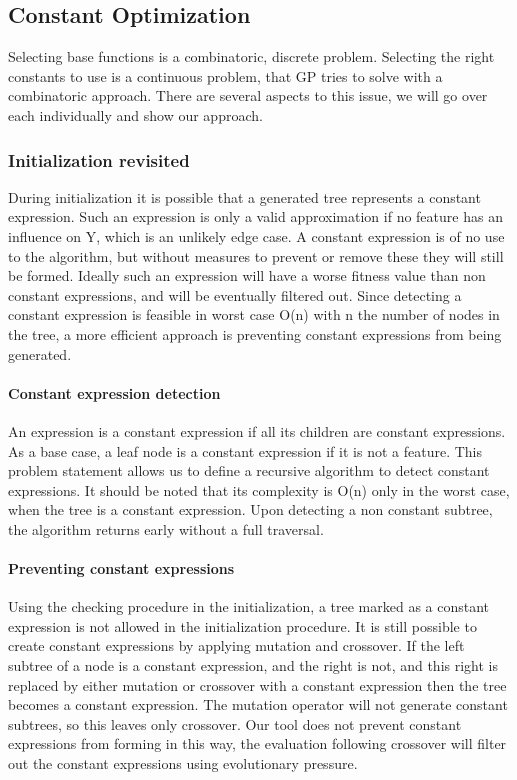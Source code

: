 \subsection{Constant Optimization} \label{subconstantoptimization}
Selecting base functions is a combinatoric, discrete problem. Selecting the right constants to use is a continuous problem, that GP tries to solve with a combinatoric approach. There are several aspects to this issue, we will go over each individually and show our approach.
\subsubsection{Initialization revisited}
During initialization it is possible that a generated tree represents a constant expression. Such an expression is only a valid approximation if no feature has an influence on Y, which is an unlikely edge case. A constant expression is of no use to the algorithm, but without measures to prevent or remove these they will still be formed. Ideally such an expression will have a worse fitness value than non constant expressions, and will be eventually filtered out. Since detecting a constant expression is feasible in worst case O(n) with n the number of nodes in the tree, a more efficient approach is preventing constant expressions from being generated. 
\paragraph{Constant expression detection}
An expression is a constant expression if all its children are constant expressions. As a base case, a leaf node is a constant expression if it is not a feature. This problem statement allows us to define a recursive algorithm to detect constant expressions. It should be noted that its complexity is O(n) only in the worst case, when the tree is a constant expression. Upon detecting a non constant subtree, the algorithm returns early without a full traversal. 
\paragraph{Preventing constant expressions}
Using the checking procedure in the initialization, a tree marked as a constant expression is not allowed in the initialization procedure.
It is still possible to create constant expressions by applying mutation and crossover. If the left subtree of a node is a constant expression, and the right is not, and this right is replaced by either mutation or crossover with a constant expression then the tree becomes a constant expression. The mutation operator will not generate constant subtrees, so this leaves only crossover. Our tool does not prevent constant expressions from forming in this way, the evaluation following crossover will filter out the constant expressions using evolutionary pressure.
